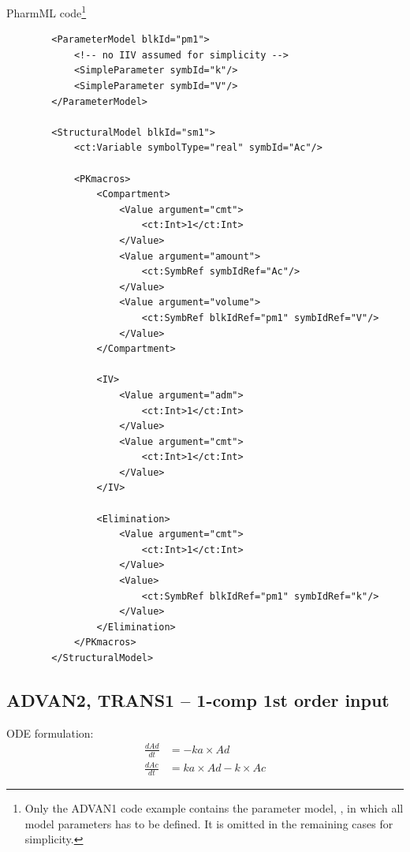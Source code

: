PharmML code\footnote{Only the ADVAN1 code example contains the parameter model, , in which
all model parameters has to be defined. It is omitted in the remaining cases for simplicity.}
\lstset{language=XML}
\begin{lstlisting}
        <ParameterModel blkId="pm1">
            <!-- no IIV assumed for simplicity -->
            <SimpleParameter symbId="k"/>
            <SimpleParameter symbId="V"/>
        </ParameterModel>

        <StructuralModel blkId="sm1">
            <ct:Variable symbolType="real" symbId="Ac"/>
            
            <PKmacros>
                <Compartment>
                    <Value argument="cmt">
                        <ct:Int>1</ct:Int>
                    </Value>
                    <Value argument="amount">
                        <ct:SymbRef symbIdRef="Ac"/>
                    </Value>
                    <Value argument="volume">
                        <ct:SymbRef blkIdRef="pm1" symbIdRef="V"/>
                    </Value>
                </Compartment>
                
                <IV>
                    <Value argument="adm">
                        <ct:Int>1</ct:Int>
                    </Value>
                    <Value argument="cmt">
                        <ct:Int>1</ct:Int>
                    </Value>
                </IV>
                
                <Elimination>
                    <Value argument="cmt">
                        <ct:Int>1</ct:Int>
                    </Value>
                    <Value>
                        <ct:SymbRef blkIdRef="pm1" symbIdRef="k"/>
                    </Value>
                </Elimination>
            </PKmacros>
        </StructuralModel>
 \end{lstlisting}


\subsection{ADVAN2, TRANS1 -- 1-comp 1st order input}
\label{subsubsec:advan2}
ODE formulation:
\begin{align}
\frac{dAd}{dt} &= -ka \times Ad \nonumber \\
\frac{dAc}{dt} &= ka \times Ad - k \times Ac  \nonumber
\end{align}


